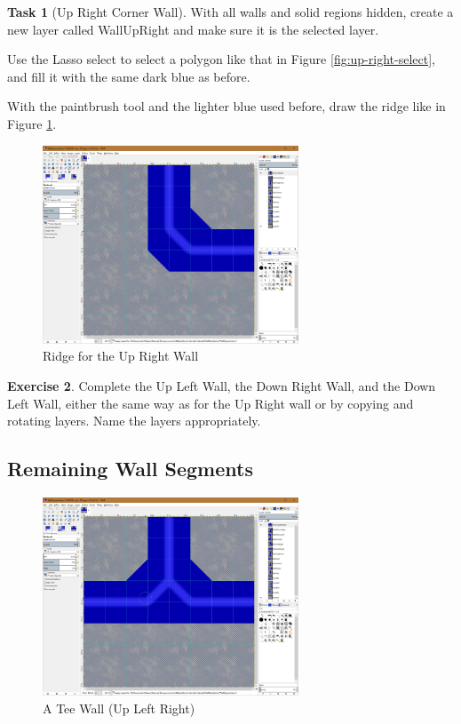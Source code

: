 \documentclass[12pt]{amsbook}
\theoremstyle{definition}
\newtheorem{exercise}{Exercise}[chapter]
\newtheorem{task}[exercise]{Task}
\theoremstyle{remark}
\numberwithin{figure}{chapter}
\numberwithin{table}{chapter}
\numberwithin{section}{chapter}
\numberwithin{equation}{section}
\begin{document}
\begin{task}[Up Right Corner Wall]
With all walls and solid regions hidden, create a new layer called WallUpRight and make sure it is the selected layer.

Use the Lasso select to select a polygon like that in Figure \ref{fig:up-right-select}, and fill it with the same dark blue as before.

With the paintbrush tool and the lighter blue used before, draw the ridge like in Figure \ref{fig:up-right-finish}.
\end{task}

\begin{figure}[h]
  \includegraphics[width=3in]{WallUpRightComplete.png}
  \caption{Ridge for the Up Right Wall}
  \label{fig:up-right-finish}
\end{figure}

\begin{exercise}
Complete the Up Left Wall, the Down Right Wall, and the Down Left Wall, either the same way as for the Up Right wall or by copying and rotating layers.  Name the layers appropriately.
\end{exercise}

\subsection{Remaining Wall Segments}


\begin{figure}[h]
  \includegraphics[width=3in]{Tee.png}
  \caption{A Tee Wall (Up Left Right)}
  \label{fig:tee}
\end{figure}
\end{document}

